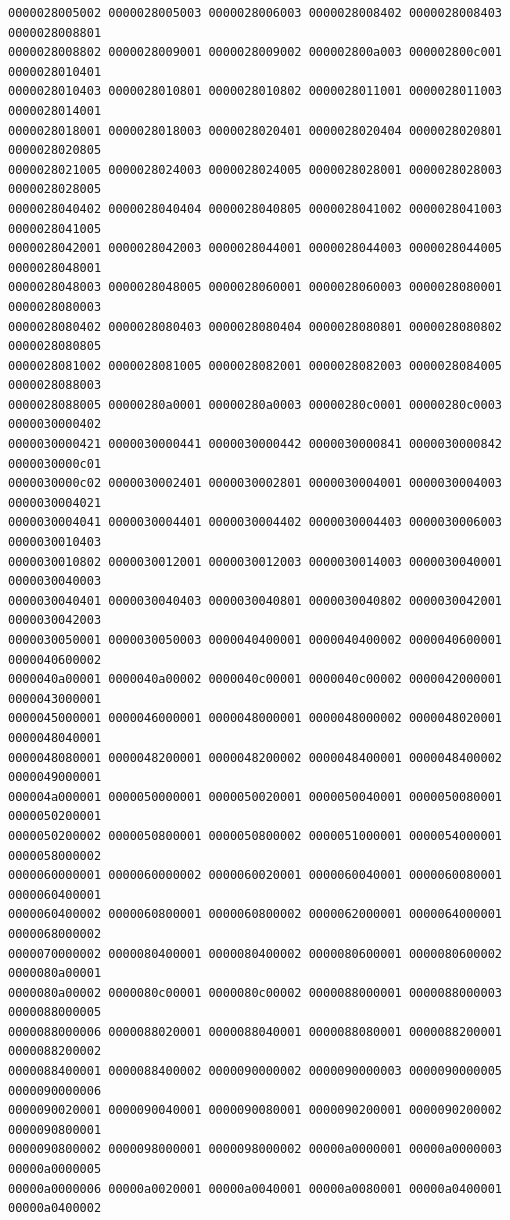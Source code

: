 \begin{Verbatim}[fontsize=\scriptsize]
0000028005002 0000028005003 0000028006003 0000028008402 0000028008403 0000028008801
0000028008802 0000028009001 0000028009002 000002800a003 000002800c001 0000028010401
0000028010403 0000028010801 0000028010802 0000028011001 0000028011003 0000028014001
0000028018001 0000028018003 0000028020401 0000028020404 0000028020801 0000028020805
0000028021005 0000028024003 0000028024005 0000028028001 0000028028003 0000028028005
0000028040402 0000028040404 0000028040805 0000028041002 0000028041003 0000028041005
0000028042001 0000028042003 0000028044001 0000028044003 0000028044005 0000028048001
0000028048003 0000028048005 0000028060001 0000028060003 0000028080001 0000028080003
0000028080402 0000028080403 0000028080404 0000028080801 0000028080802 0000028080805
0000028081002 0000028081005 0000028082001 0000028082003 0000028084005 0000028088003
0000028088005 00000280a0001 00000280a0003 00000280c0001 00000280c0003 0000030000402
0000030000421 0000030000441 0000030000442 0000030000841 0000030000842 0000030000c01
0000030000c02 0000030002401 0000030002801 0000030004001 0000030004003 0000030004021
0000030004041 0000030004401 0000030004402 0000030004403 0000030006003 0000030010403
0000030010802 0000030012001 0000030012003 0000030014003 0000030040001 0000030040003
0000030040401 0000030040403 0000030040801 0000030040802 0000030042001 0000030042003
0000030050001 0000030050003 0000040400001 0000040400002 0000040600001 0000040600002
0000040a00001 0000040a00002 0000040c00001 0000040c00002 0000042000001 0000043000001
0000045000001 0000046000001 0000048000001 0000048000002 0000048020001 0000048040001
0000048080001 0000048200001 0000048200002 0000048400001 0000048400002 0000049000001
000004a000001 0000050000001 0000050020001 0000050040001 0000050080001 0000050200001
0000050200002 0000050800001 0000050800002 0000051000001 0000054000001 0000058000002
0000060000001 0000060000002 0000060020001 0000060040001 0000060080001 0000060400001
0000060400002 0000060800001 0000060800002 0000062000001 0000064000001 0000068000002
0000070000002 0000080400001 0000080400002 0000080600001 0000080600002 0000080a00001
0000080a00002 0000080c00001 0000080c00002 0000088000001 0000088000003 0000088000005
0000088000006 0000088020001 0000088040001 0000088080001 0000088200001 0000088200002
0000088400001 0000088400002 0000090000002 0000090000003 0000090000005 0000090000006
0000090020001 0000090040001 0000090080001 0000090200001 0000090200002 0000090800001
0000090800002 0000098000001 0000098000002 00000a0000001 00000a0000003 00000a0000005
00000a0000006 00000a0020001 00000a0040001 00000a0080001 00000a0400001 00000a0400002

\end{Verbatim}
